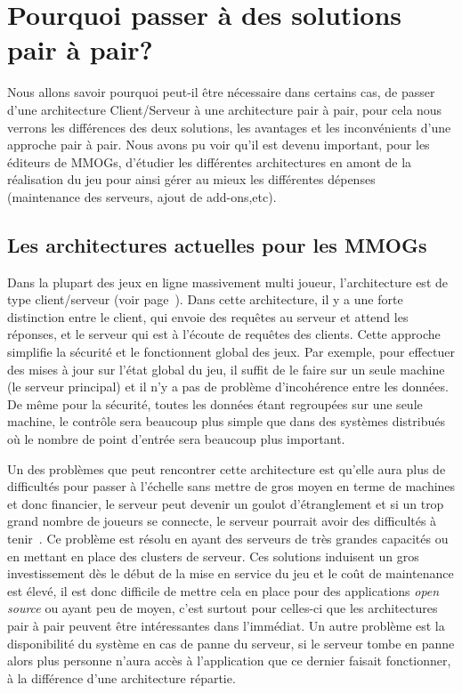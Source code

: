 \section{Pourquoi passer à des solutions pair à pair?}
	\label{whyp2p}
	Nous allons savoir pourquoi peut-il être nécessaire dans certains cas, de passer d'une architecture Client/Serveur à une architecture pair à pair, pour cela nous verrons les différences des deux solutions, les avantages et les inconvénients d'une approche pair à pair. Nous avons pu voir qu'il est devenu important, pour les éditeurs de MMOGs, d'étudier les différentes architectures en amont de la réalisation du jeu pour ainsi gérer au mieux les différentes dépenses ~\cite{14101410} (maintenance des serveurs, ajout de add-ons,etc).
	\subsection{Les architectures actuelles pour les MMOGs}
	\par Dans la plupart des jeux en ligne massivement multi joueur, l'architecture est de type client/serveur (voir page~\pageref{P2P/ClServ}). Dans cette architecture, il y a une forte distinction entre le client, qui envoie des requêtes au serveur et attend les réponses, et le serveur qui est à l'écoute de requêtes des clients. Cette approche simplifie la sécurité et le fonctionnent global des jeux. Par exemple, pour effectuer des mises à jour sur l'état global du jeu, il suffit de le faire sur un seule machine (le serveur principal) et il n'y a pas de problème d'incohérence entre les données. De même pour la sécurité, toutes les données étant regroupées sur une seule machine, le contrôle sera beaucoup plus simple que dans des systèmes distribués où le nombre de point d'entrée sera beaucoup plus important. \\
	\par Un des problèmes que peut rencontrer cette architecture est qu'elle aura plus de difficultés pour passer à l'échelle sans mettre de gros moyen en terme de machines et donc financier, le serveur peut devenir un goulot d'étranglement et si un trop grand nombre de joueurs se connecte, le serveur pourrait avoir des difficultés à tenir~\cite{1198269}. Ce problème est résolu en ayant des serveurs de très grandes capacités ou en mettant en place des clusters de serveur. Ces solutions induisent un gros investissement dès le début de la mise en service du jeu et le coût de maintenance est élevé, il est donc difficile de mettre cela en place pour des applications \textit{open source} ou ayant peu de moyen, c'est surtout pour celles-ci que les architectures pair à pair peuvent être intéressantes dans l'immédiat. Un autre problème est la disponibilité du système en cas de panne du serveur, si le serveur tombe en panne alors plus personne n'aura accès à l'application que ce dernier faisait fonctionner, à la différence d'une architecture répartie. \\
